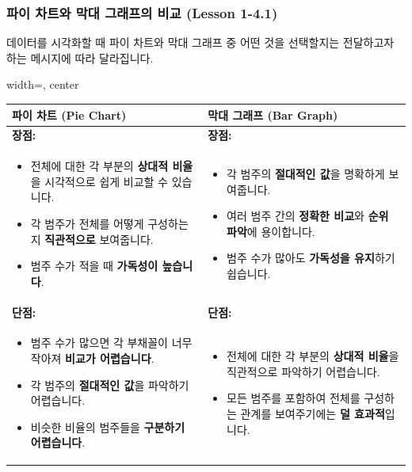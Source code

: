 \documentclass[11pt,a4paper]{article}
\theoremstyle{definition}
\begin{document}
\subsubsection*{파이 차트와 막대 그래프의 비교 (Lesson 1-4.1)}

데이터를 시각화할 때 파이 차트와 막대 그래프 중 어떤 것을 선택할지는 전달하고자 하는 메시지에 따라 달라집니다.

\begin{adjustbox}{width=\textwidth, center}
\begin{tabular}{p{}p{}}
\toprule
\textbf{파이 차트 (Pie Chart)} & \textbf{막대 그래프 (Bar Graph)} \\
\midrule
\textbf{장점:} & \textbf{장점:} \\
\begin{itemize}
    \item 전체에 대한 각 부분의 \textbf{상대적 비율}을 시각적으로 쉽게 비교할 수 있습니다.
    \item 각 범주가 전체를 어떻게 구성하는지 \textbf{직관적으로} 보여줍니다.
    \item 범주 수가 적을 때 \textbf{가독성이 높습니다}.
\end{itemize}
&
\begin{itemize}
    \item 각 범주의 \textbf{절대적인 값}을 명확하게 보여줍니다.
    \item 여러 범주 간의 \textbf{정확한 비교}와 \textbf{순위 파악}에 용이합니다.
    \item 범주 수가 많아도 \textbf{가독성을 유지}하기 쉽습니다.
\end{itemize}
\\
\textbf{단점:} & \textbf{단점:} \\
\begin{itemize}
    \item 범주 수가 많으면 각 부채꼴이 너무 작아져 \textbf{비교가 어렵습니다}.
    \item 각 범주의 \textbf{절대적인 값}을 파악하기 어렵습니다.
    \item 비슷한 비율의 범주들을 \textbf{구분하기 어렵습니다}.
\end{itemize}
&
\begin{itemize}
    \item 전체에 대한 각 부분의 \textbf{상대적 비율}을 직관적으로 파악하기 어렵습니다.
    \item 모든 범주를 포함하여 전체를 구성하는 관계를 보여주기에는 \textbf{덜 효과적}입니다.
\end{itemize}

\end{tabular}
\end{adjustbox}
\end{document}
